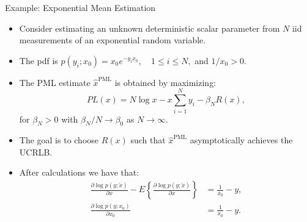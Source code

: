\documentclass{beamer}
\begin{document}
\begin{frame}{Example: Exponential Mean Estimation}

\begin{itemize}
    \item Consider estimating an unknown deterministic scalar parameter from $N$ iid measurements of an exponential random variable.
    
    \item The pdf is $p(y_i; x_0) = x_0 e^{-y_i x_0}, \quad 1 \leq i \leq N, $ and $1/x_0 > 0.$

     \item The PML estimate $\hat{x}^{\text{PML}}$ is obtained by maximizing:
    \begin{equation*}
        PL(x) = N \log x - x \sum_{i=1}^{N} y_i - \beta_N R(x),
    \end{equation*}
    for $\beta_N > 0$ with $\beta_N/N \to \beta_0$ as $N \to \infty$.

    \item The goal is to choose $R(x)$ such that $\hat{x}^{\text{PML}}$ asymptotically achieves the UCRLB.

    \item After calculations we have that:
    \begin{align*}
        \frac{\partial \log p(y; \check{x})}{\partial x} - E \left\{ \frac{\partial \log p(y; \check{x})}{\partial x} \right\} &= \frac{1}{x_0} - y, \\
        \frac{\partial \log p(y; x_0)}{\partial x_0} &= \frac{1}{x_0} - y.
    \end{align*}

\end{itemize}

\end{frame}
\end{document}
